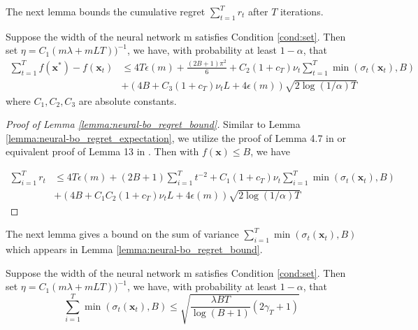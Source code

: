 The next lemma bounds the cumulative regret $\sum_{t=1}^T r_t$ after $T$ iterations. 
\begin{lemma}
\label{lemma:neural-bo_regret_bound}
Suppose the width of the neural network m satisfies Condition \ref{cond:set}. Then set $\eta = C_1(m\lambda + mLT))^{-1}$, we have, with probability at least $1-\alpha$, that
\begin{equation*}
\begin{split}
   \sum_{t=1}^T f(\mathbf{x^*}) - f(\mathbf{x}_t)
    & \leq  4T \epsilon(m) + \frac{(2B+1)\pi^2}{6} + C_2(1+c_T)\nu_t \sum^T_{t=1} \min(\sigma_t(\mathbf{x}_t),B) \\ &
    + (4B+ C_3 (1+c_T)\nu_t L + 4\epsilon(m)) \sqrt{2 \log(1/\alpha)T}
\end{split}
\end{equation*}
where $C_1, C_2, C_3$ are absolute constants.
\end{lemma}
\begin{proof}[Proof of Lemma \ref{lemma:neural-bo_regret_bound}]
    

Similar to Lemma \ref{lemma:neural-bo_regret_expectation}, we utilize the proof of Lemma 4.7 in \citet{zhang2021neural} or equivalent proof of Lemma 13 in \citet{chowdhury2017kernelized}. Then with $f(\mathbf{x})\leq B$, we have

\begin{equation*}
\begin{split}
    \sum_{i=1}^T r_t & \leq 4T\epsilon(m) + (2B+1) \sum_{i=1}^T t^{-2} + C_1 (1+c_T)\nu_t\sum_{i=1}^T \min(\sigma_t(\mathbf{x}_t),B) \\ & + (4B + C_1C_2(1 + c_T )\nu_t L + 4\epsilon(m))\sqrt{2 \log(1/\alpha)T}
\end{split} 
\end{equation*}
\end{proof}
The next lemma gives a bound on the sum of variance $\sum_{i=1}^T \min(\sigma_t(\mathbf{x}_t), B)$ which appears in Lemma \ref{lemma:neural-bo_regret_bound}.
\begin{lemma}
\label{lemma:min_sigma}
Suppose the width of the neural network m satisfies Condition \ref{cond:set}. Then set $\eta = C_1(m\lambda + mLT))^{-1}$, we have, with probability at least $1-\alpha$, that
\begin{equation*}
    \sum_{i=1}^T \min(\sigma_t(\mathbf{x}_t),B) \leq \sqrt{\frac{\lambda BT}{\log(B+1)} (2\gamma_T+1) } 
\end{equation*}
\end{lemma}
